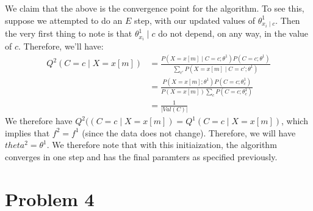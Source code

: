 \documentclass[12pt]{article}
\begin{document}
\begin{enumerate}[label=(\alph*)]
  We claim that the above is the convergence point for the algorithm. To see this, suppose we attempted to do an $E$ step, with our updated values of $\theta^1_{x_i \mid c}$. Then the very first thing to note is that $\theta^1_{x_i} \mid c$ do not depend, on any way, in the value of $c$. Therefore, we'll have:
  \begin{align*}
    Q^2(C = c \mid X = x[m]) &= \frac{P(X = x[m] \mid C = c; \theta^1)P(C=c; \theta^1)}{\sum_{c'} P(X = x[m] \mid C=c'; \theta^1)} \\
    &= \frac{P(X = x[m]; \theta^1)P(C = c;\theta^1_c)}{P(X = x[m])\sum_c P(C = c; \theta^1_c)} \tag{Since our $P(X = x[m])$ does not depend on the value of $c$} \\
    &= \frac{1}{|Val(C)|}
  \end{align*}
  We therefore have $Q^2((C = c \mid X = x[m]) = Q^1(C = c \mid X = x[m])$, which implies that $f^2 = f^1$ (since the data does not change). Therefore, we will have $theta^2 = \theta^1$. We therefore note that with this initiaization, the algorithm converges in one step and has the final paramters as specified previously.

\end{enumerate}

\pagebreak
\section*{Problem 4}
\end{document}
